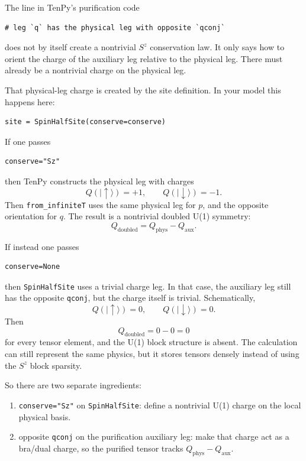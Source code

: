 \documentclass[11pt]{article}
\newcommand{\Q}{Q}
\begin{document}
The line in TenPy's purification code

\begin{Verbatim}[fontsize=\small]
# leg `q` has the physical leg with opposite `qconj`
\end{Verbatim}

does not by itself create a nontrivial \(S^z\) conservation law. It only says how
to orient the charge of the auxiliary leg relative to the physical leg. There
must already be a nontrivial charge on the physical leg.

That physical-leg charge is created by the site definition. In your model this
happens here:

\begin{Verbatim}[fontsize=\small]
site = SpinHalfSite(conserve=conserve)
\end{Verbatim}

If one passes

\begin{Verbatim}[fontsize=\small]
conserve="Sz"
\end{Verbatim}

then TenPy constructs the physical leg with charges
\[
\Q(|\uparrow\rangle)=+1,\qquad
\Q(|\downarrow\rangle)=-1.
\]
Then \texttt{from\_infiniteT} uses the same physical leg for \(p\), and the
opposite orientation for \(q\). The result is a nontrivial doubled U(1) symmetry:
\[
\Q_{\mathrm{doubled}}=\Q_{\mathrm{phys}}-\Q_{\mathrm{aux}}.
\]

If instead one passes

\begin{Verbatim}[fontsize=\small]
conserve=None
\end{Verbatim}

then \texttt{SpinHalfSite} uses a trivial charge leg. In that case, the
auxiliary leg still has the opposite \texttt{qconj}, but the charge itself is
trivial. Schematically,
\[
\Q(|\uparrow\rangle)=0,\qquad
\Q(|\downarrow\rangle)=0.
\]
Then
\[
\Q_{\mathrm{doubled}}=0-0=0
\]
for every tensor element, and the U(1) block structure is absent. The calculation
can still represent the same physics, but it stores tensors densely instead of
using the \(S^z\) block sparsity.

So there are two separate ingredients:

\begin{enumerate}[label=(\roman*)]
\item \texttt{conserve="Sz"} on \texttt{SpinHalfSite}: define a nontrivial U(1)
charge on the local physical basis.
\item opposite \texttt{qconj} on the purification auxiliary leg: make that
charge act as a bra/dual charge, so the purified tensor tracks
\(\Q_{\mathrm{phys}}-\Q_{\mathrm{aux}}\).
\end{enumerate}
\end{document}

